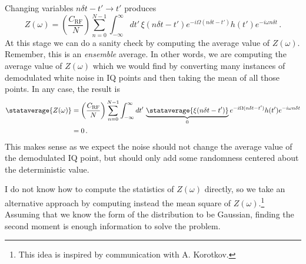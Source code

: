 Changing variables $n \delta t - t' \rightarrow t'$ produces
\begin{equation}
  Z(\omega)
  = \left( \frac{C_\text{RF}}{N} \right) \sum_{n=0}^{N-1}
  \int_{-\infty}^\infty dt' \, \xi(n \delta t - t') e^{-i \Omega (n \delta t - t')} h(t') e^{-i \omega n \delta t}  \, .
\end{equation}
At this stage we can do a sanity check by computing the average value of $Z(\omega)$.
Remember, this is an \emph{ensemble} average.
In other words, we are computing the average value of $Z(\omega)$ which we would find by converting many instances of demodulated white noise in IQ points and then taking the mean of all those points.
In any case, the result is
\begin{align}
  \stataverage{Z(\omega)}
  &= \left( \frac{C_\text{RF}}{N} \right)
    \sum_{n=0}^{N-1}
    \int_{-\infty}^\infty dt' \, \underbrace{\stataverage{\xi(n \delta t - t')}}_0 e^{-i \Omega (n \delta t - t')} h(t') e^{-i \omega n \delta t} \\
  &= 0 \, .
\end{align}
This makes sense as we expect the noise should not change the average value of the demodulated IQ point, but should only add some randomness centered about the deterministic value.


I do not know how to compute the statistics of $Z(\omega)$ directly, so we take an alternative approach by computing instead the mean square of $Z(\omega)$.\footnote{This idea is inspired by communication with A. Korotkov.}
Assuming that we know the form of the distribution to be Gaussian, finding the second moment is enough information to solve the problem.


